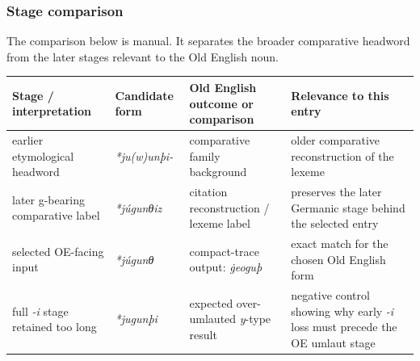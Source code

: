 \documentclass[
  british,
  a4paper,
]{article}
\newcounter{none} %
\begin{document}
\subsubsection{Stage comparison}\label{stage-comparison}

The comparison below is manual. It separates the broader comparative
headword from the later stages relevant to the Old English noun.

{\def\LTcaptype{none} %
\begin{longtable}[]{@{}
  >{\raggedright\arraybackslash}p{}
  >{\raggedright\arraybackslash}p{}
  >{\raggedright\arraybackslash}p{}
  >{\raggedright\arraybackslash}p{}@{}}
\toprule\noalign{}
\begin{minipage}[b]{\linewidth}\raggedright
Stage / interpretation
\end{minipage} & \begin{minipage}[b]{\linewidth}\raggedright
Candidate form
\end{minipage} & \begin{minipage}[b]{\linewidth}\raggedright
Old English outcome or comparison
\end{minipage} & \begin{minipage}[b]{\linewidth}\raggedright
Relevance to this entry
\end{minipage} \\
\midrule\noalign{}
\endhead
\bottomrule\noalign{}
\endlastfoot
earlier etymological headword & \emph{*ju(w)unþi-} & comparative family
background & older comparative reconstruction of the lexeme \\
later g-bearing comparative label & \emph{*júgunθiz} & citation
reconstruction / lexeme label & preserves the later Germanic stage
behind the selected entry \\
selected OE-facing input & \emph{*júgunθ} & compact-trace output:
\emph{ġeoguþ} & exact match for the chosen Old English form \\
full \emph{-i} stage retained too long & \emph{*jugunþi} & expected
over-umlauted \emph{y}-type result & negative control showing why early
\emph{-i} loss must precede the OE umlaut stage \\
\end{longtable}
}
\end{document}
